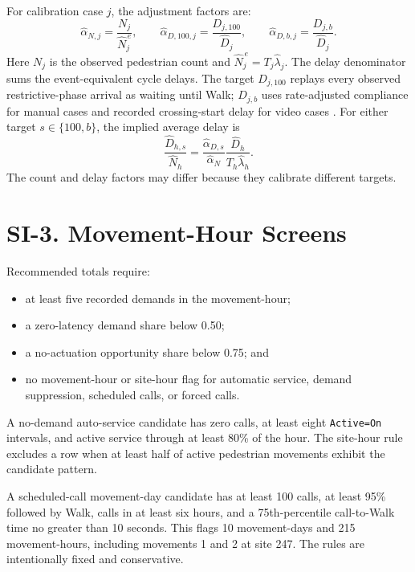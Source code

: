\documentclass[11pt]{article}
\begin{document}
For calibration case $j$, the adjustment factors are:
\begin{equation}
\widehat\alpha_{N,j}=\frac{N_j}{\widehat N_j^{\,e}},\qquad
\widehat\alpha_{D,100,j}=\frac{D_{j,100}}{\widehat D_j},\qquad
\widehat\alpha_{D,b,j}=\frac{D_{j,b}}{\widehat D_j}.
\end{equation}
Here $N_j$ is the observed pedestrian count and $\widehat N_j^{\,e}=T_j\widehat\lambda_j$. The delay denominator sums the event-equivalent cycle delays. The target $D_{j,100}$ replays every observed restrictive-phase arrival as waiting until Walk; $D_{j,b}$ uses rate-adjusted compliance for manual cases and recorded crossing-start delay for video cases \citep{levinson2026firstActuationCalibration}. For either target $s\in\{100,b\}$, the implied average delay is
\begin{equation}
\frac{\widehat D_{h,s}}{\widehat N_h}
=\frac{\widehat\alpha_{D,s}}{\widehat\alpha_N}
\frac{\widehat D_h}{T_h\widehat\lambda_h}.
\end{equation}
The count and delay factors may differ because they calibrate different targets.

\section*{SI-3. Movement-Hour Screens}

Recommended totals require:
\begin{itemize}
  \item at least five recorded demands in the movement-hour;
  \item a zero-latency demand share below 0.50;
  \item a no-actuation opportunity share below 0.75; and
  \item no movement-hour or site-hour flag for automatic service, demand suppression, scheduled calls, or forced calls.
\end{itemize}

A no-demand auto-service candidate has zero calls, at least eight \texttt{Active=On} intervals, and active service through at least 80\% of the hour. The site-hour rule excludes a row when at least half of active pedestrian movements exhibit the candidate pattern.

A scheduled-call movement-day candidate has at least 100 calls, at least 95\% followed by Walk, calls in at least six hours, and a 75th-percentile call-to-Walk time no greater than 10 seconds. This flags 10 movement-days and 215 movement-hours, including movements 1 and 2 at site 247. The rules are intentionally fixed and conservative.
\end{document}
